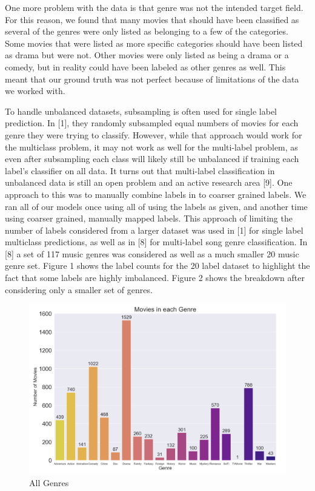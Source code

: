 \documentclass[sigconf]{acmart}
\begin{document}
One more problem with the data is that genre was not the intended target field.  For this reason, we found that many movies that should have been classified as several of the genres were only listed as belonging to a few of the categories.  Some movies that were listed as more specific categories should have been listed as drama but were not. Other movies were only listed as being a drama or a comedy, but in reality could have been labeled as other genres as well.  This meant that our ground truth was not perfect because of limitations of the data we worked with. 

To handle unbalanced datasets, subsampling is often used for single label prediction.  In [1], they randomly subsampled equal numbers of movies for each genre they were trying to classify.  However, while that approach would work for the multiclass problem, it may not work as well for the multi-label problem, as even after subsampling each class will likely still be unbalanced if training each label's classifier on all data. It turns out that multi-label classification in unbalanced data is still an open problem and an active research area [9]. One approach to this was to manually combine labels in to coarser grained labels.  We ran all of our models once using all of using the labels as given, and another time using coarser grained, manually mapped labels. This approach of limiting the number of labels considered from a larger dataset was used in [1] for single label multiclass predictions, as well as in [8] for multi-label song genre classification. In [8] a set of 117 music genres was considered as well as a much smaller 20 music genre set. Figure 1 shows the label counts for the 20 label dataset to highlight the fact that some labels are highly imbalanced. Figure 2 shows the breakdown after considering only a smaller set of genres.

\begin{figure}
	\includegraphics[width=\linewidth]{all_genres.png}
	\caption{All Genres}
	\label{fig:all}
\end{figure}
\end{document}

